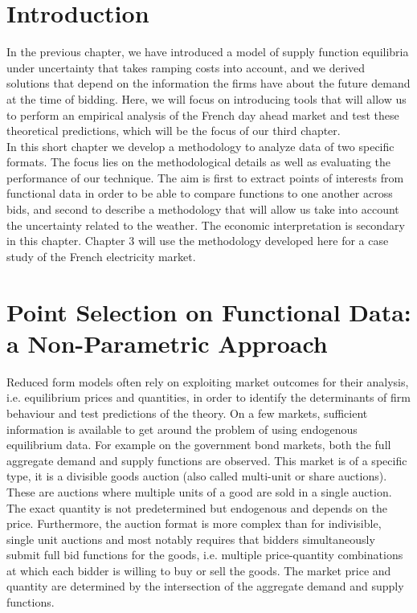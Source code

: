 \doublespacing
\section{Introduction}
In the previous chapter, we have introduced a model of supply function equilibria under uncertainty that takes ramping costs into account, and we derived solutions that depend on the information the firms have about the future demand at the time of bidding. Here, we will focus on introducing tools that will allow us to perform an empirical analysis of the French day ahead market and test these theoretical predictions, which will be the focus of our third chapter.\\

In this short chapter we develop a methodology to analyze data of two specific formats. The focus lies on the methodological details as well as evaluating the performance of our technique. The aim is first to extract points of interests from functional data in order to be able to compare functions to one another across bids, and second to describe a methodology that will allow us take into account the uncertainty related to the weather. The economic interpretation is secondary in this chapter. Chapter 3 will use the methodology developed here for a case study of the French electricity market.\\

\section{Point Selection on Functional Data: a Non-Parametric Approach}
Reduced form models often rely on exploiting market outcomes for their analysis, i.e. equilibrium prices and quantities, in order to identify the determinants of firm behaviour and test predictions of the theory. On a few markets, sufficient information is available to get around the problem of using endogenous equilibrium data. For example on the government bond markets, both the full aggregate demand and supply functions are observed. This market is of a specific type, it is a divisible goods auction (also called multi-unit or share auctions). These are auctions where multiple units of a good are sold in a single auction. The exact quantity is not predetermined but endogenous and depends on the price. Furthermore, the auction format is more complex than for indivisible, single unit auctions and most notably requires that bidders simultaneously submit full bid functions for the goods, i.e. multiple price-quantity combinations at which each bidder is willing to buy or sell the goods. The market price and quantity are determined by the intersection of the aggregate demand and supply functions.\\


